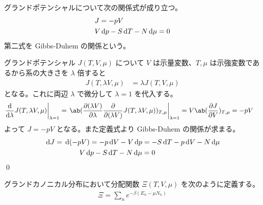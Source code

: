 \documentclass[uplatex,diffipdfmx,a4paper,11pt]{jlreq}
\makeatletter
\numberwithin{equation}{section}
\theoremstyle{definition}
\renewenvironment{proof}[1][\proofname]{\par
  \normalfont
  \topsep6\p@\@plus6\p@ \trivlist
  \item[\hskip\labelsep{\bfseries #1}\@addpunct{\bfseries}]\ignorespaces\quad\par
}{%
  \qed\endtrivlist\@endpefalse
}
\renewcommand\proofname{証明}
\makeatother
\begin{document}
\begin{theorem}
  グランドポテンシャルについて次の関係式が成り立つ。
  \begin{align}
     & J = -pV                           \\
     & V\dl{p} - S\dl{T} - N\dl{\mu} = 0
  \end{align}
  第二式を Gibbs-Duhem の関係という。
\end{theorem}
\begin{proof}
  グランドポテンシャル $J(T, V, \mu)$ について $V$ は示量変数、$T, \mu$ は示強変数であるから系の大きさを $\lambda$ 倍すると
  \begin{align}
    J(T, \lambda V, \mu) & = \lambda J(T, V, \mu)
  \end{align}
  となる。これに両辺 $\lambda$ で微分して $\lambda = 1$ を代入する。
  \begin{align}
    \left.\diff{}{\lambda}J(T, \lambda V, \mu)\right|_{\lambda = 1} & = \left.\ab(\diffp{(\lambda V)}{\lambda}\diffp{}{(\lambda V)}J(T, \lambda V, \mu))_{T,\mu}\right|_{\lambda = 1} = V\ab(\diffp{J}{V})_{T,\mu} = -pV
  \end{align}
  よって $J = -pV$ となる。また定義式より Gibbs-Duhem の関係が求まる。
  \begin{align}
    \dl{J} = \dl{(-pV)} = - p\dl{V} - V\dl{p} & = -S\dl{T} - p\dl{V} - N\dl{\mu} \\
    V\dl{p} - S\dl{T} - N\dl{\mu}             & = 0
  \end{align}
\end{proof}

\begin{definition}[グランドカノニカル分布]
  グランドカノニカル分布において分配関数 $\Xi(T, V, \mu)$ を次のように定義する。
  \begin{align}
    \Xi = \sum_{n}e^{-\beta(E_n - \mu N_n)}
  \end{align}
\end{definition}
\end{document}

